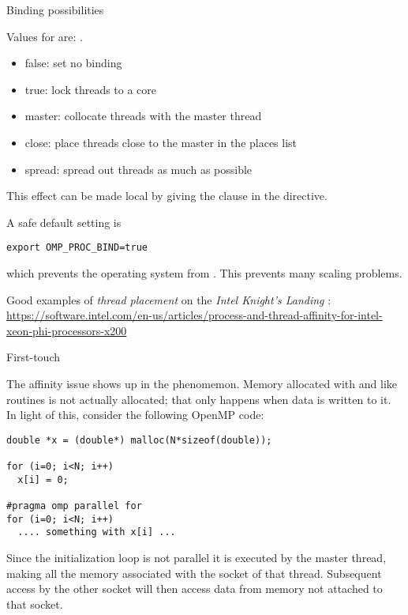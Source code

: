  {Binding possibilities}

Values for  are: .
\begin{itemize}
\item false: set no binding \item true: lock threads to a core \item
  master: collocate threads with the master thread \item close: place
  threads close to the master in the places list \item spread: spread
  out threads as much as possible
\end{itemize}

This effect can be made local by
giving the  clause in the
 directive.

A safe default setting is
\begin{verbatim}
export OMP_PROC_BIND=true
\end{verbatim}
which prevents the operating system from
. This prevents many scaling problems.

Good examples of \emph{thread placement} on the
\emph{Intel Knight's Landing}%
:
\url{https://software.intel.com/en-us/articles/process-and-thread-affinity-for-intel-xeon-phi-processors-x200}


 {First-touch}
\label{sec:first-touch}

The affinity issue shows up in the 
phenomemon. Memory allocated with  and like
routines is not actually allocated; that only happens when data is
written to it. In light of this, consider the following OpenMP code:
\begin{verbatim}
double *x = (double*) malloc(N*sizeof(double));

for (i=0; i<N; i++)
  x[i] = 0;

#pragma omp parallel for
for (i=0; i<N; i++)
  .... something with x[i] ...
\end{verbatim}
Since the initialization loop is not parallel it is executed by the
master thread, making all the memory associated with the socket of
that thread. Subsequent access by the other socket will then access
data from memory not attached to that socket.

